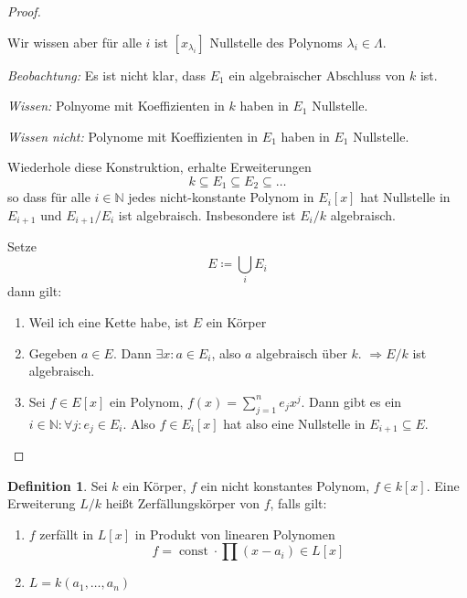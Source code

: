 \documentclass[12pt,parskip=full]{scrartcl}
\newcommand{\setN}{\mathbb{N}}
\theoremstyle{definition}
\newtheorem{definition}[theorem]{Definition}
\theoremstyle{remark}
\begin{document}
\begin{proof}
\begin{enumerate}
			Wir wissen aber für alle $i$ ist $[x_{\lambda_i}]$ Nullstelle des Polynoms $\lambda_i \in \Lambda$.
		\end{enumerate}
	
		\textit{Beobachtung:} Es ist nicht klar, dass $E_1$ ein algebraischer Abschluss von $k$ ist.
		
		\textit{Wissen:} Polnyome mit Koeffizienten in $k$ haben in $E_1$ Nullstelle.
		
		\textit{Wissen nicht:} Polynome mit Koeffizienten in $E_1$ haben in $E_1$ Nullstelle.
		
		Wiederhole diese Konstruktion, erhalte Erweiterungen
		\begin{equation*}
			k \subseteq E_1 \subseteq E_2 \subseteq \dots
		\end{equation*}
		so dass für alle $i \in \setN$ jedes nicht-konstante Polynom in $E_i[x]$ hat Nullstelle in $E_{i+1}$ und $E_{i+1} / E_i$ ist algebraisch. Insbesondere ist $E_i / k$ algebraisch.
		
		Setze
		\begin{equation*}
			E \coloneqq \bigcup_i E_i
		\end{equation*}
		dann gilt:
		\begin{enumerate}
			\item Weil ich eine Kette habe, ist $E$ ein Körper
			\item Gegeben $a \in E$. Dann $\exists x: a \in E_i$, also $a$ algebraisch über $k$. $\Rightarrow E/k$ ist algebraisch.
			\item Sei $f \in E[x]$ ein Polynom, $f(x) = \sum_{j=1}^n e_j x^j$. Dann gibt es ein $i \in \setN: \forall j: e_j \in E_i$. Also $f \in E_i[x]$ hat also eine Nullstelle in $E_{i+1} \subseteq E$.
		\end{enumerate}
	\end{proof}

	\begin{definition}
		Sei $k$ ein Körper, $f$ ein nicht konstantes Polynom, $f \in k[x]$. Eine Erweiterung $L/k$ heißt Zerfällungskörper von $f$, falls gilt:
		\begin{enumerate}
			\item $f$ zerfällt in $L[x]$ in Produkt von linearen Polynomen
			\begin{equation*}
				f = \operatorname{const} \cdot \prod (x - a_i) \in L[x]
			\end{equation*}
			\item $L = k(a_1, \dots, a_n)$
		\end{enumerate}
	\end{definition}
\end{document}
